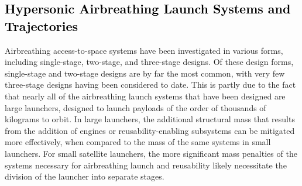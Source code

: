   
  
  
  

   
   
   






    \textcolor{black}{
  \section{Hypersonic Airbreathing Launch Systems and Trajectories}\label{sec:AscentTrajectories}
}
  
 
 \noindent
Airbreathing access-to-space systems have been investigated in various forms, including single-stage, two-stage, and three-stage designs. 
Of these design forms, single-stage and two-stage designs are by far the most common, with very few three-stage designs having been considered to date. This is partly due to the fact that nearly all of the airbreathing launch systems that have been designed are large launchers, designed to launch payloads of the order of thousands of kilograms to orbit. In large launchers, the additional structural mass that results from the addition of engines or reusability-enabling subsystems can be mitigated more effectively, when compared to the mass of the same systems in small launchers.
For small satellite launchers, the more significant mass penalties of the systems necessary for airbreathing launch and reusability likely necessitate the division of the launcher into separate stages\cite{Preller2017b}. 
 
